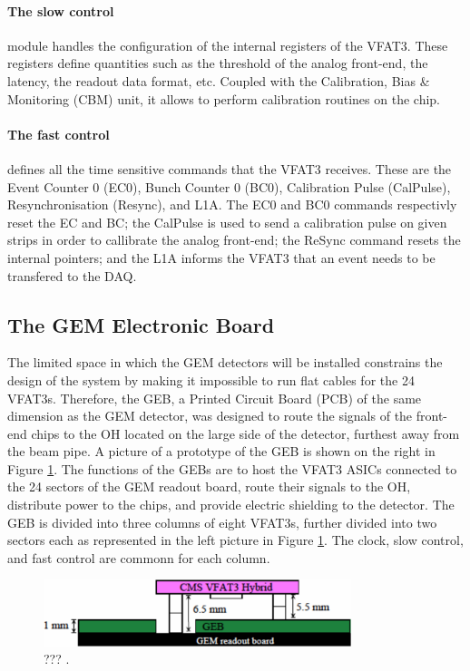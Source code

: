       \paragraph{The slow control} module handles the configuration of the internal registers of the VFAT3. These registers define quantities such as the threshold of the analog front-end, the latency, the readout data format, etc. Coupled with the Calibration, Bias \& Monitoring (CBM) unit, it allows to perform calibration routines on the chip. \\

      \paragraph{The fast control} defines all the time sensitive commands that the VFAT3 receives. These are the Event Counter 0 (EC0), Bunch Counter 0 (BC0), Calibration Pulse (CalPulse), Resynchronisation (Resync), and L1A. The EC0 and BC0 commands respectivly reset the EC and BC; the CalPulse is used to send a calibration pulse on given strips in order to callibrate the analog front-end; the ReSync command resets the internal pointers; and the L1A informs the VFAT3 that an event needs to be transfered to the DAQ.

    \subsection{The GEM Electronic Board}

      The limited space in which the GEM detectors will be installed constrains the design of the system by making it impossible to run flat cables for the 24 VFAT3s. Therefore, the GEB, a Printed Circuit Board (PCB) of the same dimension as the GEM detector, was designed to route the signals of the front-end chips to the OH located on the large side of the detector, furthest away from the beam pipe. A picture of a prototype of the GEB is shown on the right in Figure \ref{fig:II-2-daq-geb}. The functions of the GEBs are to host the VFAT3 ASICs connected to the 24 sectors of the GEM readout board, route their signals to the OH, distribute power to the chips, and provide electric shielding to the detector. The GEB is divided into three columns of eight VFAT3s, further divided into two sectors each as represented in the left picture in Figure \ref{fig:II-2-daq-geb}. The clock, slow control, and fast control are commonn for each column. \\

      \begin{figure}[h!]
        \centering
        \includegraphics[width=0.8\textwidth]{img/II-2-daq/geb.pdf}
        \caption{??? \cite{Colaleo:2021453}.}
        \label{fig:II-2-daq-geb}
      \end{figure}

